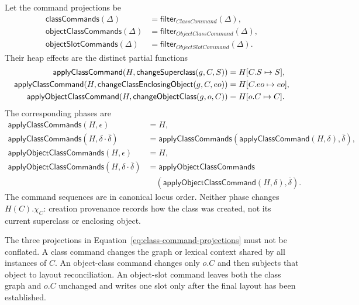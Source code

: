 Let the command projections be
\begin{equation}\label{eq:class-command-projections}
\begin{aligned}
 \mathsf{classCommands}(\Delta)&=
  \mathsf{filter}_{\mathit{ClassCommand}}(\Delta),\\
 \mathsf{objectClassCommands}(\Delta)&=
  \mathsf{filter}_{\mathit{ObjectClassCommand}}(\Delta),\\
 \mathsf{objectSlotCommands}(\Delta)&=
  \mathsf{filter}_{\mathit{ObjectSlotCommand}}(\Delta).
\end{aligned}
\end{equation}
Their heap effects are the distinct partial functions
\begin{equation}\label{eq:class-object-heap-effects}
\begin{aligned}
 \mathsf{applyClassCommand}(H,\mathsf{changeSuperclass}(g,C,S))
   &=H[C.S\mapsto S],\\
 \mathsf{applyClassCommand}(H,\mathsf{changeClassEnclosingObject}(g,C,eo))
   &=H[C.eo\mapsto eo],\\
 \mathsf{applyObjectClassCommand}(H,\mathsf{changeObjectClass}(g,o,C))
   &=H[o.C\mapsto C].
\end{aligned}
\end{equation}
The corresponding phases are
\begin{equation}\label{eq:class-object-command-folds}
\begin{aligned}
 \mathsf{applyClassCommands}(H,\epsilon)&=H,\\
 \mathsf{applyClassCommands}(H,\delta\cdot\bar\delta)
   &=\mathsf{applyClassCommands}
       (\mathsf{applyClassCommand}(H,\delta),\bar\delta),\\
 \mathsf{applyObjectClassCommands}(H,\epsilon)&=H,\\
 \mathsf{applyObjectClassCommands}(H,\delta\cdot\bar\delta)
   &=\mathsf{applyObjectClassCommands}\\
   &\quad(\mathsf{applyObjectClassCommand}(H,\delta),\bar\delta).
\end{aligned}
\end{equation}
The command sequences are in canonical locus order.  Neither phase changes
$H(C).\chi_C$: creation provenance records how the class was created, not its
current superclass or enclosing object.

The three projections in Equation~\eqref{eq:class-command-projections} must
not be conflated.  A class command changes the graph or lexical context shared
by all instances of $C$.  An object-class command changes only $o.C$ and then
subjects that object to layout reconciliation.  An object-slot command leaves
both the class graph and $o.C$ unchanged and writes one slot only after the
final layout has been established.

